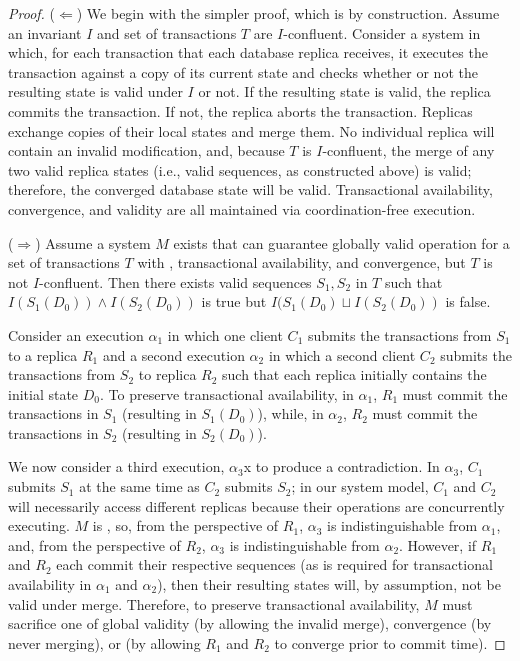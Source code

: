 \begin{proof}
($\Leftarrow$) We begin with the simpler proof, which is by
  construction. Assume an invariant $I$ and set of transactions $T$
  are $I$-confluent. Consider a system in which, for each transaction
  that each database replica receives, it executes the transaction
  against a copy of its current state and checks whether or not the
  resulting state is valid under $I$ or not. If the resulting state is
  valid, the replica commits the transaction. If not, the replica
  aborts the transaction. Replicas exchange copies of their local
  states and merge them. No individual replica will contain an invalid
  modification, and, because $T$ is $I$-confluent, the merge of any
  two valid replica states (i.e., valid sequences, as constructed
  above) is valid; therefore, the converged database state will be
  valid. Transactional availability, convergence, and validity are all
  maintained via coordination-free execution.

($\Rightarrow$) Assume a system $M$ exists that can guarantee globally
  valid operation for a set of transactions $T$ with \cfreedom,
  transactional availability, and convergence, but $T$ is not
  $I$-confluent. Then there exists valid sequences $S_1,S_2$ in $T$
  such that $I(S_1(D_0)) \wedge I(S_2(D_0))$ is true but $I(S_1(D_0)
  \sqcup I(S_2(D_0))$ is false.

  Consider an execution $\alpha_1$ in which one client $C_1$ submits
  the transactions from $S_1$ to a replica $R_1$ and a second
  execution $\alpha_2$ in which a second client $C_2$ submits the
  transactions from $S_2$ to replica $R_2$ such that each replica
  initially contains the initial state $D_0$. To preserve
  transactional availability, in $\alpha_1$, $R_1$ must commit the
  transactions in $S_1$ (resulting in $S_1(D_0)$), while, in
  $\alpha_2$, $R_2$ must commit the transactions in $S_2$ (resulting
  in $S_2(D_0)$).

   We now consider a third execution, $\alpha_3$x to produce a
   contradiction. In $\alpha_3$, $C_1$ submits $S_1$ at the same time
   as $C_2$ submits $S_2$; in our system model, $C_1$ and $C_2$ will
   necessarily access different replicas because their operations are
   concurrently executing. $M$ is \cfree, so, from the perspective of
   $R_1$, $\alpha_3$ is indistinguishable from $\alpha_1$, and, from
   the perspective of $R_2$, $\alpha_3$ is indistinguishable from
   $\alpha_2$. However, if $R_1$ and $R_2$ each commit their
   respective sequences (as is required for transactional availability
   in $\alpha_1$ and $\alpha_2$), then their resulting states will, by
   assumption, not be valid under merge. Therefore, to preserve
   transactional availability, $M$ must sacrifice one of global
   validity (by allowing the invalid merge), convergence (by never
   merging), or \cfreedom (by allowing $R_1$ and $R_2$ to converge
   prior to commit time).
\end{proof}

